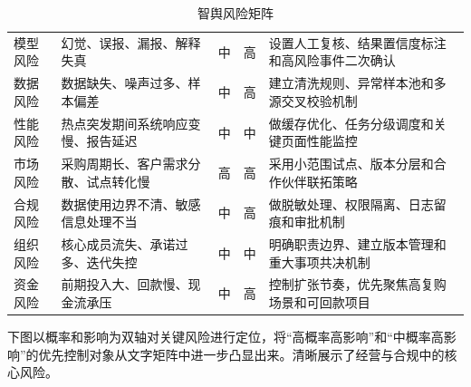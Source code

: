 \begin{table}[htbp]
	\centering
	\caption{智舆风险矩阵}
	\begin{tabularx}{\textwidth}{L{2.2cm}L{3.1cm}C{1.4cm}C{1.4cm}Y}
		\toprule
		 &      &  &  &            \\
		\midrule
		模型风险           & 幻觉、误报、漏报、解释失真      & 中            & 高            & 设置人工复核、结果置信度标注和高风险事件二次确认 \\
		数据风险           & 数据缺失、噪声过多、样本偏差     & 中            & 高            & 建立清洗规则、异常样本池和多源交叉校验机制    \\
		性能风险           & 热点突发期间系统响应变慢、报告延迟  & 中            & 中            & 做缓存优化、任务分级调度和关键页面性能监控    \\
		市场风险           & 采购周期长、客户需求分散、试点转化慢 & 高            & 高            & 采用小范围试点、版本分层和合作伙伴联拓策略    \\
		合规风险           & 数据使用边界不清、敏感信息处理不当  & 中            & 高            & 做脱敏处理、权限隔离、日志留痕和审批机制     \\
		组织风险           & 核心成员流失、承诺过多、迭代失控   & 中            & 中            & 明确职责边界、建立版本管理和重大事项共决机制   \\
		资金风险           & 前期投入大、回款慢、现金流承压    & 中            & 高            & 控制扩张节奏，优先聚焦高复购场景和可回款项目   \\
		\bottomrule
	\end{tabularx}
\end{table}

下图以概率和影响为双轴对关键风险进行定位，将“高概率高影响”和“中概率高影响”的优先控制对象从文字矩阵中进一步凸显出来。清晰展示了经营与合规中的核心风险。

